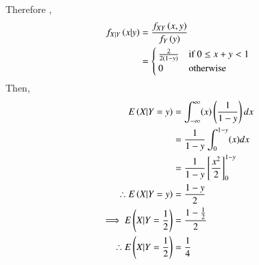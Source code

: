 \documentclass[journal,12pt,twocolumn]{IEEEtran}
\begin{document}
Therefore ,
\begin{align}
    f_{X|Y}\left(x|y\right) &= \frac{f_{XY}\left(x,y\right)}{f_Y\left(y\right)}\\
    & = 
    \begin{cases}
    \frac{2}{2(1-y)} & \text{if } 0\leq x+y < 1\\
    0 & \text{otherwise}
    \end{cases}
\end{align}
Then, 
\begin{align}
   E\left(X|Y=y\right) & =
   \int_{-\infty}^{\infty} (x)\left(\frac{1}{1-y}\right)dx\\
    & = \frac{1}{1-y} \int_{0}^{1-y}(x)dx\\
    & = \frac{1}{1-y} \left[ \frac{x^2}{2} \right]_{0}^{1-y} \\
\therefore  E\left(X|Y=y\right)& = \frac{1-y}{2}\\
\implies  E\left(X|Y=\frac{1}{2}\right) & = \frac{1-\frac{1}{2}}{2}\\
\therefore E\left(X|Y= \frac{1}{2}\right) &= \frac{1}{4}
\end{align}
\end{document}
